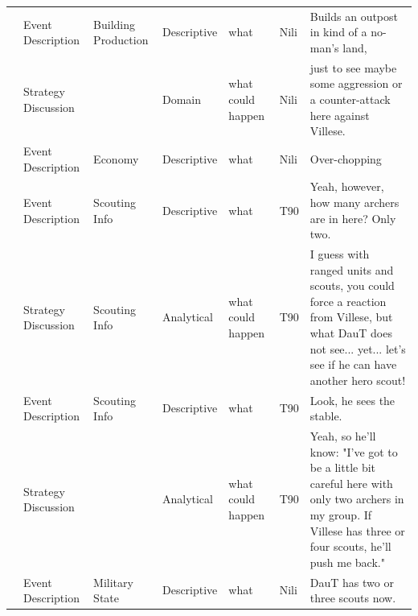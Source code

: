 {\begin{longtable}{@{}>{\theAppRow}r|L{2.3cm}L{2.2cm}L{1.4cm}L{2.2cm}L{0.5cm}U{5.6cm}@{}}
    & Event Description     & Building Production  & Descriptive   & what              & Nili    & Builds an outpost in kind of a no-man's land,                                                                                                                                                                            \\
    & Strategy Discussion   &                      & Domain      & what could happen & Nili    & just to see maybe some aggression or a counter-attack here against Villese.                                                                                                                                              \\
    & Event Description     & Economy                & Descriptive   & what              & Nili    & Over-chopping                                                                                                                                                                                                            \\
    & Event Description     & Scouting Info        & Descriptive   & what              & T90     & Yeah, however, how many archers are in here? Only two.                                                                                                                                                                   \\
    & Strategy Discussion   & Scouting Info        & Analytical  & what could happen & T90     & I guess with ranged units and scouts, you could force a reaction from Villese, but what DauT does not see... yet... let's see if he can have another hero scout!                                                         \\
    & Event Description     & Scouting Info        & Descriptive   & what              & T90     & Look, he sees the stable.                                                                                                                                                                                                \\
    & Strategy Discussion   &                      & Analytical  & what could happen & T90     & Yeah, so he'll know: "I've got to be a little bit careful here with only two archers in my group. If Villese has three or four scouts, he'll push me back."                                                              \\
    & Event Description     & Military State       & Descriptive   & what              & Nili    & DauT has two or three scouts now.                                                                                                                                                                                        \\

\end{longtable}}
